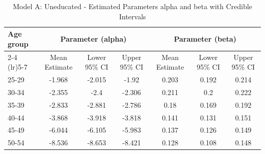 \begin{landscape}
\begin{table}[htbp]
\centering
\caption{Model A: Uneducated - Estimated Parameters alpha and beta with Credible Intervals}
\label{tab:Fparameters_ab1}
\begin{tabular}{@{}lcccccc@{}}
\toprule
Age group & \multicolumn{3}{c}{Parameter (alpha)} & \multicolumn{3}{c}{Parameter (beta)} \\ 
\cmidrule(lr){2-4} \cmidrule(lr){5-7}
          & Mean Estimate & Lower 95\% CI & Upper 95\% CI & Mean Estimate & Lower 95\% CI & Upper 95\% CI \\ 
\midrule
25-29 & -1.968 & -2.015 & -1.92 & 0.203 & 0.192 & 0.214 \\
30-34 & -2.355 & -2.4 & -2.306 & 0.211 & 0.2 & 0.222 \\
35-39 & -2.833 & -2.881 & -2.786 & 0.18 & 0.169 & 0.192 \\
40-44 & -3.868 & -3.918 & -3.818 & 0.141 & 0.131 & 0.151 \\
45-49 & -6.044 & -6.105 & -5.983 & 0.137 & 0.126 & 0.149 \\
50-54 & -8.536 & -8.653 & -8.421 & 0.128 & 0.108 & 0.148 \\
\bottomrule
\end{tabular}
\end{table}
\end{landscape}
